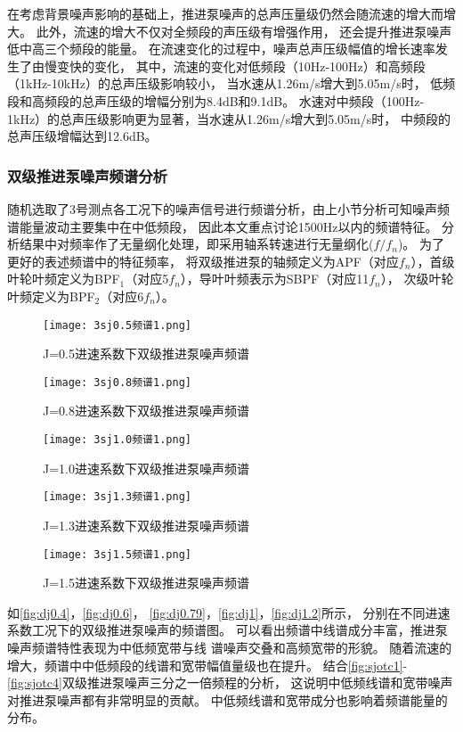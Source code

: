在考虑背景噪声影响的基础上，推进泵噪声的总声压量级仍然会随流速的增大而增大。
此外，流速的增大不仅对全频段的声压级有增强作用，
还会提升推进泵噪声低中高三个频段的能量。
在流速变化的过程中，噪声总声压级幅值的增长速率发生了由慢变快的变化，
其中，流速的变化对低频段（10Hz-100Hz）和高频段（1kHz-10kHz）的总声压级影响较小，
当水速从1.26m/s增大到5.05m/s时，
低频段和高频段的总声压级的增幅分别为8.4dB和9.1dB。
水速对中频段（100Hz-1kHz）的总声压级影响更为显著，当水速从1.26m/s增大到5.05m/s时，
中频段的总声压级增幅达到12.6dB。
\subsubsection{双级推进泵噪声频谱分析}
随机选取了3号测点各工况下的噪声信号进行频谱分析，由上小节分析可知噪声频谱能量波动主要集中在中低频段，
因此本文重点讨论1500Hz以内的频谱特征。
分析结果中对频率作了无量纲化处理，即采用轴系转速进行无量纲化($f/f_n$)。
为了更好的表述频谱中的特征频率，
将双级推进泵的轴频定义为APF（对应$f_n$），首级叶轮叶频定义为BPF$_1$（对应5$f_n$），导叶叶频表示为SBPF（对应11$f_n$），
次级叶轮叶频定义为BPF$_2$（对应6$f_n$）。
\begin{figure}[htbp]
    \centering
    \texttt{[image: 3sj0.5频谱1.png]}
    \caption{\label{fig:sj0.5}J=0.5进速系数下双级推进泵噪声频谱}
\end{figure}
\begin{figure}[htbp]
    \centering
    \texttt{[image: 3sj0.8频谱1.png]}
    \caption{\label{fig:sj0.8}J=0.8进速系数下双级推进泵噪声频谱}
\end{figure}
\begin{figure}[htbp]
    \centering
    \texttt{[image: 3sj1.0频谱1.png]}
    \caption{\label{fig:sj1.0}J=1.0进速系数下双级推进泵噪声频谱}
\end{figure}
\begin{figure}[htbp]
    \centering
    \texttt{[image: 3sj1.3频谱1.png]}
    \caption{\label{fig:sj1.3}J=1.3进速系数下双级推进泵噪声频谱}
\end{figure}
\begin{figure}[htbp]
    \centering
    \texttt{[image: 3sj1.5频谱1.png]}
    \caption{\label{fig:sj1.5}J=1.5进速系数下双级推进泵噪声频谱}
\end{figure}

如\autoref{fig:dj0.4}，\autoref{fig:dj0.6}，
\autoref{fig:dj0.79}，\autoref{fig:dj1}，\autoref{fig:dj1.2}所示，
分别在不同进速系数工况下的双级推进泵噪声的频谱图。
可以看出频谱中线谱成分丰富，推进泵噪声频谱特性表现为中低频宽带与线
谱噪声交叠和高频宽带的形貌。
随着流速的增大，频谱中中低频段的线谱和宽带幅值量级也在提升。
结合\autoref{fig:sjotc1}-\autoref{fig:sjotc4}双级推进泵噪声三分之一倍频程的分析，
这说明中低频线谱和宽带噪声对推进泵噪声都有非常明显的贡献。
中低频线谱和宽带成分也影响着频谱能量的分布。

